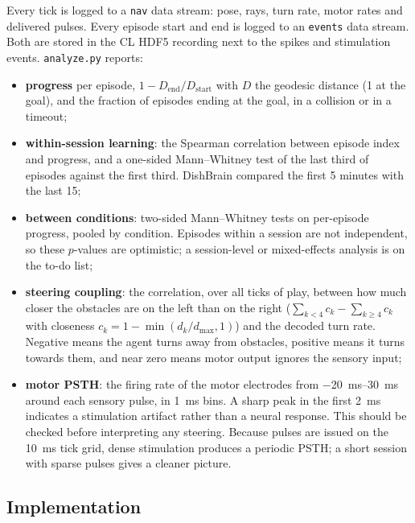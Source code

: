 \documentclass[11pt,a4paper]{article}
\newcommand{\code}[1]{\texttt{#1}}
\begin{document}
Every tick is logged to a \code{nav} data stream: pose, rays, turn rate, motor rates and
delivered pulses. Every episode start and end is logged to an \code{events} data stream. Both
are stored in the CL HDF5 recording next to the spikes and stimulation events. \code{analyze.py}
reports:
\begin{itemize}[nosep]
  \item \textbf{progress} per episode, $1-D_{\text{end}}/D_{\text{start}}$ with $D$ the geodesic
        distance (1 at the goal), and the fraction of episodes ending at the goal, in a collision
        or in a timeout;
  \item \textbf{within-session learning}: the Spearman correlation between episode index and
        progress, and a one-sided Mann--Whitney test of the last third of episodes against the
        first third. DishBrain compared the first 5 minutes with the last 15;
  \item \textbf{between conditions}: two-sided Mann--Whitney tests on per-episode progress,
        pooled by condition. Episodes within a session are not independent, so these $p$-values
        are optimistic; a session-level or mixed-effects analysis is on the to-do list;
  \item \textbf{steering coupling}: the correlation, over all ticks of play, between how much
        closer the obstacles are on the left than on the right ($\sum_{k<4}c_k-\sum_{k\geq4}c_k$
        with closeness $c_k=1-\min(d_k/d_{\max},1)$) and the decoded turn rate. Negative means the
        agent turns away from obstacles, positive means it turns towards them, and near zero means
        motor output ignores the sensory input;
  \item \textbf{motor PSTH}: the firing rate of the motor electrodes from \SIrange{-20}{30}{\milli\second}
        around each sensory pulse, in \SI{1}{\milli\second} bins. A sharp peak in the first
        \SI{2}{\milli\second} indicates a stimulation artifact rather than a neural response. This
        should be checked before interpreting any steering. Because pulses are issued on the
        \SI{10}{\milli\second} tick grid, dense stimulation produces a periodic PSTH; a short
        session with sparse pulses gives a cleaner picture.
\end{itemize}

\subsection{Implementation}
\end{document}
